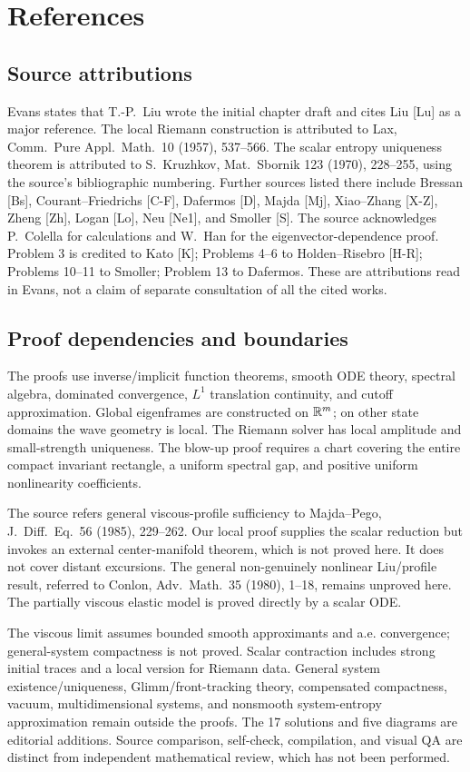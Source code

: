 \clearpage
\section{References}
\label{sec:11-6}
\subsection*{Source attributions}
Evans states that T.-P.~Liu wrote the initial chapter draft and cites
Liu [Lu] as a major reference. The local Riemann construction is
attributed to Lax, Comm.~Pure Appl.~Math.~10 (1957), 537--566.
The scalar entropy uniqueness theorem is attributed to S.~Kruzhkov,
Mat.~Sbornik 123 (1970), 228--255, using the source's bibliographic
numbering. Further sources listed there include Bressan [Bs],
Courant--Friedrichs [C-F], Dafermos [D], Majda [Mj], Xiao--Zhang [X-Z],
Zheng [Zh], Logan [Lo], Neu [Ne1], and Smoller [S].
The source acknowledges P.~Colella for calculations and W.~Han for
the eigenvector-dependence proof. Problem 3 is credited to Kato [K];
Problems 4--6 to Holden--Risebro [H-R]; Problems 10--11 to Smoller;
Problem 13 to Dafermos. These are attributions read in Evans, not a
claim of separate consultation of all the cited works.

\subsection*{Proof dependencies and boundaries}
The proofs use inverse/implicit function theorems, smooth ODE theory,
spectral algebra, dominated convergence, $L^1$ translation continuity,
and cutoff approximation. Global eigenframes are constructed on $\mathbb{R}^m$;
on other state domains the wave geometry is local. The Riemann solver
has local amplitude and small-strength uniqueness. The blow-up proof
requires a chart covering the entire compact invariant rectangle,
a uniform spectral gap, and positive uniform nonlinearity coefficients.

The source refers general viscous-profile sufficiency to Majda--Pego,
J.~Diff.~Eq.~56 (1985), 229--262. Our local proof supplies the scalar
reduction but invokes an external center-manifold theorem, which is
not proved here. It does not cover distant excursions. The general
non-genuinely nonlinear Liu/profile result, referred to Conlon,
Adv.~Math.~35 (1980), 1--18, remains unproved here. The partially
viscous elastic model is proved directly by a scalar ODE.

The viscous limit assumes bounded smooth approximants and a.e.
convergence; general-system compactness is not proved. Scalar
contraction includes strong initial traces and a local version for
Riemann data. General system existence/uniqueness, Glimm/front-tracking
theory, compensated compactness, vacuum, multidimensional systems,
and nonsmooth system-entropy approximation remain outside the proofs.
The 17 solutions and five diagrams are editorial additions. Source
comparison, self-check, compilation, and visual QA are distinct from
independent mathematical review, which has not been performed.
